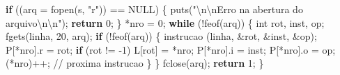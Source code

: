 \documentclass[
  brazilian,
  letterpaper,
]{book}
\newenvironment{Shaded}{\begin{snugshade}}{\end{snugshade}}
\newcommand{\CommentTok}[1]{\textcolor[rgb]{0.37,0.37,0.37}{#1}}
\newcommand{\ControlFlowTok}[1]{\textcolor[rgb]{0.00,0.23,0.31}{\textbf{#1}}}
\newcommand{\DataTypeTok}[1]{\textcolor[rgb]{0.68,0.00,0.00}{#1}}
\newcommand{\DecValTok}[1]{\textcolor[rgb]{0.68,0.00,0.00}{#1}}
\newcommand{\NormalTok}[1]{\textcolor[rgb]{0.00,0.23,0.31}{#1}}
\newcommand{\OperatorTok}[1]{\textcolor[rgb]{0.37,0.37,0.37}{#1}}
\newcommand{\SpecialCharTok}[1]{\textcolor[rgb]{0.37,0.37,0.37}{#1}}
\newcommand{\StringTok}[1]{\textcolor[rgb]{0.13,0.47,0.30}{#1}}
\theoremstyle{plain}
\theoremstyle{definition}
\theoremstyle{remark}
\begin{document}
\begin{Shaded}
\begin{Highlighting}[]
    \ControlFlowTok{if} \OperatorTok{((}\NormalTok{arq }\OperatorTok{=}\NormalTok{ fopen}\OperatorTok{(}\NormalTok{s}\OperatorTok{,} \StringTok{"r"}\OperatorTok{))} \OperatorTok{==}\NormalTok{ NULL}\OperatorTok{)}
    \OperatorTok{\{}
\NormalTok{        puts}\OperatorTok{(}\StringTok{"}\SpecialCharTok{\textbackslash{}n\textbackslash{}n}\StringTok{Erro na abertura do arquivo}\SpecialCharTok{\textbackslash{}n\textbackslash{}n}\StringTok{"}\OperatorTok{);}
        \ControlFlowTok{return} \DecValTok{0}\OperatorTok{;}
    \OperatorTok{\}}
    \OperatorTok{*}\NormalTok{nro }\OperatorTok{=} \DecValTok{0}\OperatorTok{;}
    \ControlFlowTok{while} \OperatorTok{(!}\NormalTok{feof}\OperatorTok{(}\NormalTok{arq}\OperatorTok{))}
    \OperatorTok{\{}
        \DataTypeTok{int}\NormalTok{ rot}\OperatorTok{,}\NormalTok{ inst}\OperatorTok{,}\NormalTok{ op}\OperatorTok{;}
\NormalTok{        fgets}\OperatorTok{(}\NormalTok{linha}\OperatorTok{,} \DecValTok{20}\OperatorTok{,}\NormalTok{ arq}\OperatorTok{);}
        \ControlFlowTok{if} \OperatorTok{(!}\NormalTok{feof}\OperatorTok{(}\NormalTok{arq}\OperatorTok{))} \OperatorTok{\{}
\NormalTok{           instrucao }\OperatorTok{(}\NormalTok{linha}\OperatorTok{,} \OperatorTok{\&}\NormalTok{rot}\OperatorTok{,} \OperatorTok{\&}\NormalTok{inst}\OperatorTok{,} \OperatorTok{\&}\NormalTok{op}\OperatorTok{);}
\NormalTok{           P}\OperatorTok{[*}\NormalTok{nro}\OperatorTok{].}\NormalTok{r }\OperatorTok{=}\NormalTok{ rot}\OperatorTok{;}
           \ControlFlowTok{if} \OperatorTok{(}\NormalTok{rot }\OperatorTok{!=} \OperatorTok{{-}}\DecValTok{1}\OperatorTok{)}
\NormalTok{              L}\OperatorTok{[}\NormalTok{rot}\OperatorTok{]} \OperatorTok{=} \OperatorTok{*}\NormalTok{nro}\OperatorTok{;}
\NormalTok{           P}\OperatorTok{[*}\NormalTok{nro}\OperatorTok{].}\NormalTok{i }\OperatorTok{=}\NormalTok{ inst}\OperatorTok{;}
\NormalTok{           P}\OperatorTok{[*}\NormalTok{nro}\OperatorTok{].}\NormalTok{o }\OperatorTok{=}\NormalTok{ op}\OperatorTok{;}
           \OperatorTok{(*}\NormalTok{nro}\OperatorTok{)++;} \CommentTok{// proxima instrucao}
        \OperatorTok{\}}
    \OperatorTok{\}}
\NormalTok{    fclose}\OperatorTok{(}\NormalTok{arq}\OperatorTok{);}
    \ControlFlowTok{return} \DecValTok{1}\OperatorTok{;}
\OperatorTok{\}}


\end{Highlighting}
\end{Shaded}
\end{document}
